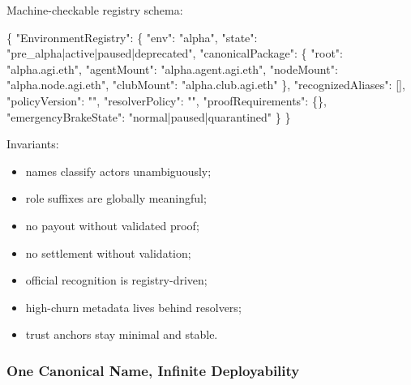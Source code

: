 \documentclass[
  11pt,
]{article}
\newenvironment{Shaded}{}{}
\newcommand{\DataTypeTok}[1]{\textcolor[rgb]{0.56,0.13,0.00}{#1}}
\newcommand{\FunctionTok}[1]{\textcolor[rgb]{0.02,0.16,0.49}{#1}}
\newcommand{\OtherTok}[1]{\textcolor[rgb]{0.00,0.44,0.13}{#1}}
\newcommand{\StringTok}[1]{\textcolor[rgb]{0.25,0.44,0.63}{#1}}
\providecommand{\tightlist}{%
  \setlength{\itemsep}{0pt}\setlength{\parskip}{0pt}}
\begin{document}
Machine-checkable registry schema:

\begin{Shaded}
\begin{Highlighting}[]
\FunctionTok{\{}
  \DataTypeTok{"EnvironmentRegistry"}\FunctionTok{:} \FunctionTok{\{}
    \DataTypeTok{"env"}\FunctionTok{:} \StringTok{"alpha"}\FunctionTok{,}
    \DataTypeTok{"state"}\FunctionTok{:} \StringTok{"pre\_alpha|active|paused|deprecated"}\FunctionTok{,}
    \DataTypeTok{"canonicalPackage"}\FunctionTok{:} \FunctionTok{\{}
      \DataTypeTok{"root"}\FunctionTok{:} \StringTok{"alpha.agi.eth"}\FunctionTok{,}
      \DataTypeTok{"agentMount"}\FunctionTok{:} \StringTok{"alpha.agent.agi.eth"}\FunctionTok{,}
      \DataTypeTok{"nodeMount"}\FunctionTok{:} \StringTok{"alpha.node.agi.eth"}\FunctionTok{,}
      \DataTypeTok{"clubMount"}\FunctionTok{:} \StringTok{"alpha.club.agi.eth"}
    \FunctionTok{\},}
    \DataTypeTok{"recognizedAliases"}\FunctionTok{:} \OtherTok{[]}\FunctionTok{,}
    \DataTypeTok{"policyVersion"}\FunctionTok{:} \StringTok{""}\FunctionTok{,}
    \DataTypeTok{"resolverPolicy"}\FunctionTok{:} \StringTok{""}\FunctionTok{,}
    \DataTypeTok{"proofRequirements"}\FunctionTok{:} \FunctionTok{\{\},}
    \DataTypeTok{"emergencyBrakeState"}\FunctionTok{:} \StringTok{"normal|paused|quarantined"}
  \FunctionTok{\}}
\FunctionTok{\}}
\end{Highlighting}
\end{Shaded}

Invariants:

\begin{itemize}
\tightlist
\item
  names classify actors unambiguously;
\item
  role suffixes are globally meaningful;
\item
  no payout without validated proof;
\item
  no settlement without validation;
\item
  official recognition is registry-driven;
\item
  high-churn metadata lives behind resolvers;
\item
  trust anchors stay minimal and stable.
\end{itemize}

\subsubsection{One Canonical Name, Infinite
Deployability}\label{one-canonical-name-infinite-deployability}
\end{document}

